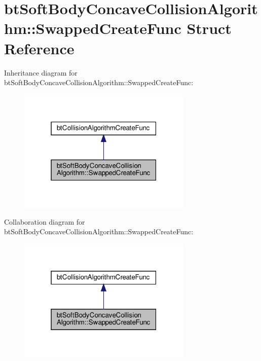 \hypertarget{structbtSoftBodyConcaveCollisionAlgorithm_1_1SwappedCreateFunc}{}\section{bt\+Soft\+Body\+Concave\+Collision\+Algorithm\+:\+:Swapped\+Create\+Func Struct Reference}
\label{structbtSoftBodyConcaveCollisionAlgorithm_1_1SwappedCreateFunc}


Inheritance diagram for bt\+Soft\+Body\+Concave\+Collision\+Algorithm\+:\+:Swapped\+Create\+Func\+:
\nopagebreak
\begin{figure}[H]
\begin{center}
\leavevmode
\includegraphics[width=235pt]{structbtSoftBodyConcaveCollisionAlgorithm_1_1SwappedCreateFunc__inherit__graph}
\end{center}
\end{figure}


Collaboration diagram for bt\+Soft\+Body\+Concave\+Collision\+Algorithm\+:\+:Swapped\+Create\+Func\+:
\nopagebreak
\begin{figure}[H]
\begin{center}
\leavevmode
\includegraphics[width=235pt]{structbtSoftBodyConcaveCollisionAlgorithm_1_1SwappedCreateFunc__coll__graph}
\end{center}
\end{figure}
